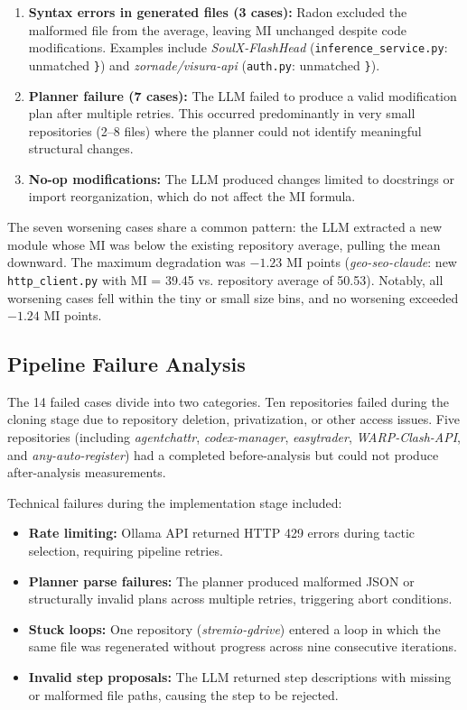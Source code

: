 \documentclass[sigconf,review,anonymous]{acmart}
\begin{document}
\begin{enumerate}[nosep]
    \item \textbf{Syntax errors in generated files (3 cases):} Radon excluded the malformed file from the average, leaving MI unchanged despite code modifications. Examples include \textit{SoulX-FlashHead} (\texttt{inference\_service.py}: unmatched \texttt{\}}) and \textit{zornade/visura-api} (\texttt{auth.py}: unmatched \texttt{\}}).
    \item \textbf{Planner failure (7 cases):} The LLM failed to produce a valid modification plan after multiple retries. This occurred predominantly in very small repositories (2--8 files) where the planner could not identify meaningful structural changes.
    \item \textbf{No-op modifications:} The LLM produced changes limited to docstrings or import reorganization, which do not affect the MI formula.
\end{enumerate}

The seven worsening cases share a common pattern: the LLM extracted a new module whose MI was below the existing repository average, pulling the mean downward. The maximum degradation was $-1.23$ MI points (\textit{geo-seo-claude}: new \texttt{http\_client.py} with MI = 39.45 vs. repository average of 50.53). Notably, all worsening cases fell within the tiny or small size bins, and no worsening exceeded $-1.24$ MI points.

\subsection{Pipeline Failure Analysis}

The 14 failed cases divide into two categories. Ten repositories failed during the cloning stage due to repository deletion, privatization, or other access issues. Five repositories (including \textit{agentchattr}, \textit{codex-manager}, \textit{easytrader}, \textit{WARP-Clash-API}, and \textit{any-auto-register}) had a completed before-analysis but could not produce after-analysis measurements.

Technical failures during the implementation stage included:

\begin{itemize}[nosep]
    \item \textbf{Rate limiting:} Ollama API returned HTTP 429 errors during tactic selection, requiring pipeline retries.
    \item \textbf{Planner parse failures:} The planner produced malformed JSON or structurally invalid plans across multiple retries, triggering abort conditions.
    \item \textbf{Stuck loops:} One repository (\textit{stremio-gdrive}) entered a loop in which the same file was regenerated without progress across nine consecutive iterations.
    \item \textbf{Invalid step proposals:} The LLM returned step descriptions with missing or malformed file paths, causing the step to be rejected.
\end{itemize}
\end{document}
